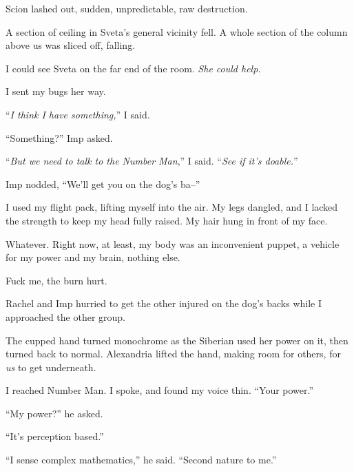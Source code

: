 Scion lashed out, sudden, unpredictable, raw destruction.



A section of ceiling in Sveta's general vicinity fell.  A whole section of the column above us was sliced off, falling.



I could see Sveta on the far end of the room.  \emph{She could help.}



I sent my bugs her way.



``\emph{I think I have something,}'' I said.



``Something?'' Imp asked.



``\emph{But we need to talk to the Number Man},'' I said.  ``\emph{See if it's doable.}''



Imp nodded, ``We'll get you on the dog's ba--''



I used my flight pack, lifting myself into the air.  My legs dangled, and I lacked the strength to keep my head fully raised.  My hair hung in front of my face.



Whatever.  Right now, at least, my body was an inconvenient puppet, a vehicle for my power and my brain, nothing else.



Fuck me, the burn hurt.



Rachel and Imp hurried to get the other injured on the dog's backs while I approached the other group.



The cupped hand turned monochrome as the Siberian used her power on it, then turned back to normal.  Alexandria lifted the hand, making room for others, for \emph{us} to get underneath.



I reached Number Man.  I spoke, and found my voice thin.  ``Your power.''



``My power?'' he asked.



``It's perception based.''



``I sense complex mathematics,'' he said.  ``Second nature to me.''



